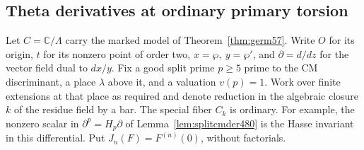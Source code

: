 \documentclass[a4paper,11pt]{article}
\theoremstyle{definition}
\theoremstyle{remark}
\numberwithin{equation}{section}
\begin{document}
\subsection{Theta derivatives at ordinary primary torsion}
\label{sec:ordinaryprimary492}

Let \(C=\mathbb C/\Lambda\) carry the marked model of
Theorem~\ref{thm:germ57}. Write \(O\) for its origin, \(t\) for its
nonzero point of order two, \(x=\wp,\ y=\wp'\), and
\(\partial=d/dz\) for the vector field dual to \(dx/y\).
Fix a good split prime \(p\ge5\) prime to the CM discriminant,
a place \(\lambda\) above it, and a valuation \(v(p)=1\).
Work over finite extensions at that place as required and denote
reduction in the algebraic closure \(k\) of the residue field by a bar.
The special fiber \(C_k\) is ordinary. For example, the nonzero
scalar in \(\partial^p=H_p\partial\) of
Lemma~\ref{lem:splitcmder480} is the Hasse invariant in this
differential. Put \(J_n(F)=F^{(n)}(0)\), without factorials.
\end{document}
